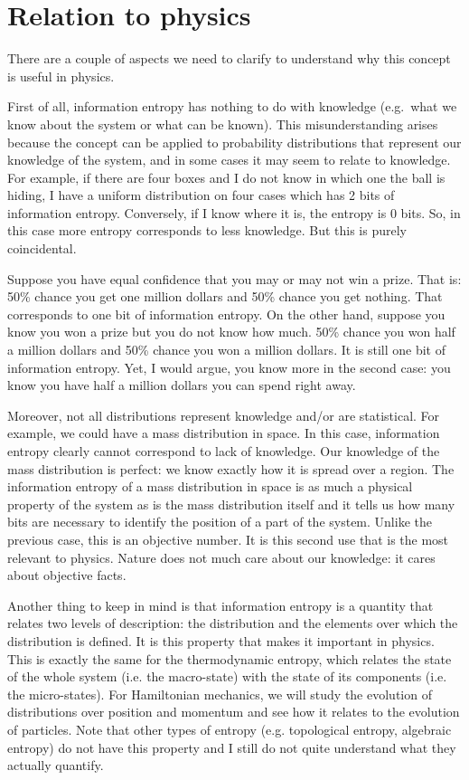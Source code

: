 \documentclass[aps,pra,10pt,floatfix,nofootinbib]{revtex4-1}
\theoremstyle{definition}
\begin{document}
\section{Relation to physics}

There are a couple of aspects we need to clarify to understand why this concept is useful in physics.

First of all, information entropy has nothing to do with knowledge (e.g.~what we know about the system or what can be known). This misunderstanding arises because the concept can be applied to probability distributions that represent our knowledge of the system, and in some cases it may seem to relate to knowledge. For example, if there are four boxes and I do not know in which one the ball is hiding, I have a uniform distribution on four cases which has 2 bits of information entropy. Conversely, if I know where it is, the entropy is 0 bits. So, in this case more entropy corresponds to less knowledge. But this is purely coincidental.

Suppose you have equal confidence that you may or may not win a prize. That is: 50\% chance you get one million dollars and 50\% chance you get nothing. That corresponds to one bit of information entropy. On the other hand, suppose you know you won a prize but you do not know how much. 50\% chance you won half a million dollars and 50\% chance you won a million dollars. It is still one bit of information entropy. Yet, I would argue, you know more in the second case: you know you have half a million dollars you can spend right away.

Moreover, not all distributions represent knowledge and/or are statistical. For example, we could have a mass distribution in space. In this case, information entropy clearly cannot correspond to lack of knowledge. Our knowledge of the mass distribution is perfect: we know exactly how it is spread over a region. The information entropy of a mass distribution in space is as much a physical property of the system as is the mass distribution itself and it tells us how many bits are necessary to identify the position of a part of the system. Unlike the previous case, this is an objective number. It is this second use that is the most relevant to physics. Nature does not much care about our knowledge: it cares about objective facts.

Another thing to keep in mind is that information entropy is a quantity that relates two levels of description: the distribution and the elements over which the distribution is defined. It is this property that makes it important in physics. This is exactly the same for the thermodynamic entropy, which relates the state of the whole system (i.e. the macro-state) with the state of its components (i.e. the micro-states). For Hamiltonian mechanics, we will study the evolution of distributions over position and momentum and see how it relates to the evolution of particles. Note that other types of entropy (e.g. topological entropy, algebraic entropy) do not have this property and I still do not quite understand what they actually quantify.
\end{document}
